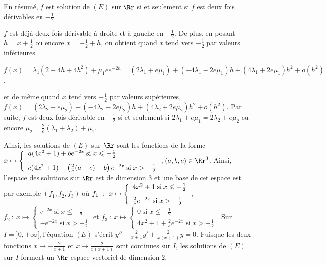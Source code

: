 {\begin{enumerate}
{En résumé, $f$ est solution de $(E)$ sur $\Rr$ si et seulement si $f$ est deux fois dérivables en $- \frac{1}{2}$.

$f$ est déjà deux fois dérivable à droite et à gauche en $- \frac{1}{2}$. De plus, en posant $h=x+ \frac{1}{2}$ ou encore $x=- \frac{1}{2}+h$, on obtient quand $x$ tend vers $- \frac{1}{2}$ par valeurs inférieures

\begin{center}
$f(x)=\lambda_1(2-4h+4h^2)+\mu_1ee^{-2h}=(2\lambda_1+e\mu_1)+(-4\lambda_1-2e\mu_1)h+(4\lambda_1+2e\mu_1)h^2+o(h^2)$,
\end{center}

et de même quand $x$ tend vers $- \frac{1}{2}$ par valeurs supérieures, $f(x)=(2\lambda_2+e\mu_2)+(-4\lambda_2-2e\mu_2)h+(4\lambda_2+2e\mu_2)h^2+o(h^2)$. Par suite, $f$ est deux fois dérivable en $- \frac{1}{2}$ si et seulement si $2\lambda_1+e\mu_1=2\lambda_2+e\mu_2$ ou encore $\mu_2= \frac{2}{e}(\lambda_1+\lambda_2)+\mu_1$.

Ainsi, les solutions de $(E)$ sur $\Rr$ sont les fonctions de la forme $x\mapsto\left\{
\begin{array}{l}
a(4x^2+1)+b e^{-2x}\;\text{si}\;x\leqslant- \frac{1}{2}\\
\rule{0mm}{6mm}c(4x^2+1)+\left( \frac{2}{e}(a+c)-b\right)e^{-2x}\;\text{si}\;x>- \frac{1}{2}
\end{array}
\right.$, $(a,b,c)\in\Rr^3$. Ainsi, l'espace des solutions sur $\Rr$ est de dimension $3$ et une base de cet espace est par exemple $(f_1,f_2,f_3)$ où $f_1~:~x\mapsto\left\{
\begin{array}{l}
4x^2+1\;\text{si}\;x\leqslant- \frac{1}{2}\\
\rule{0mm}{6mm} \frac{2}{e}e^{-2x}\;\text{si}\;x>- \frac{1}{2}
\end{array}
\right.$, $f_2~:~x\mapsto\left\{
\begin{array}{l}
e^{-2x}\;\text{si}\;x\leqslant- \frac{1}{2}\\
-e^{-2x}\;\text{si}\;x>- \frac{1}{2}
\end{array}
\right.$ et $f_3~:~x\mapsto\left\{
\begin{array}{l}
0\;\text{si}\;x\leqslant- \frac{1}{2}\\
4x^2+1+ \frac{2}{e}e^{-2x}\;\text{si}\;x>- \frac{1}{2}
\end{array}
\right.$.
Sur $I=]0,+\infty[$, l'équation $(E)$ s'écrit $y''- \frac{2}{x+1}y'+ \frac{2}{x(x+1)}y=0$. Puisque les deux fonctions $x\mapsto- \frac{2}{x+1}$ et $x\mapsto \frac{2}{x(x+1)}$ sont continues sur $I$, les solutions de $(E)$ sur $I$ forment un $\Rr$-espace vectoriel de dimension $2$.

}
\end{enumerate}}
